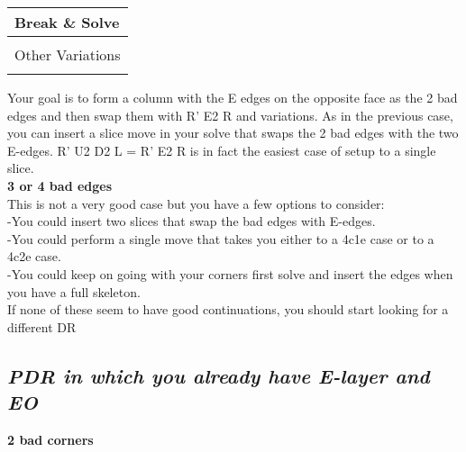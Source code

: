 \documentclass[11pt,a4paper]{book}
\newcommand{\p}{\textquotesingle}
\newcommand{\m}{\texttt}
\newcommand{\ps}{\p\,\,}
\begin{document}
\bigskip
\begin{tabular}{|l|}
\hline
\textbf{Break \& Solve }\\
\hline
\begin{minipage}[l]{0.650\textwidth}
\bigskip
\bigskip
\m{R\ps E2  R or R E2 R'\ps\\
Other Variations \\}
\bigskip
\bigskip
\end{minipage}
\begin{minipage}[c]{0.25\textwidth}
\centering
\def\svgwidth{\columnwidth}

\end{minipage}\\
\hline
\end{tabular}
\bigskip
\newline
Your goal is to form a column with the E edges on the opposite face as the 2 bad edges and then swap them with R’ E2 R and variations.
As in the previous case, you can insert a slice move in your solve that swaps the 2 bad edges with the two E-edges. R’ U2 D2 L = R’ E2 R is in fact \bigskip
the easiest case of setup to a single slice.\\
\newpage
\hfill \break
\textbf{3 or 4  bad edges}\\
This is not a very good case but you have a few options to consider:\\
-You could insert two slices that swap the bad edges with E-edges.\\
-You could perform a single move that takes you either to a 4c1e case or to a 4c2e case.\\
-You could keep on going with your corners first solve and insert the edges when you have a full skeleton.\\
\newline
If none of these seem to have good continuations, you should start looking for a different DR
\bigskip
\subsection{\textit{PDR in which you already have E-layer and EO}}

\textbf{2 bad corners}\\
\end{document}
